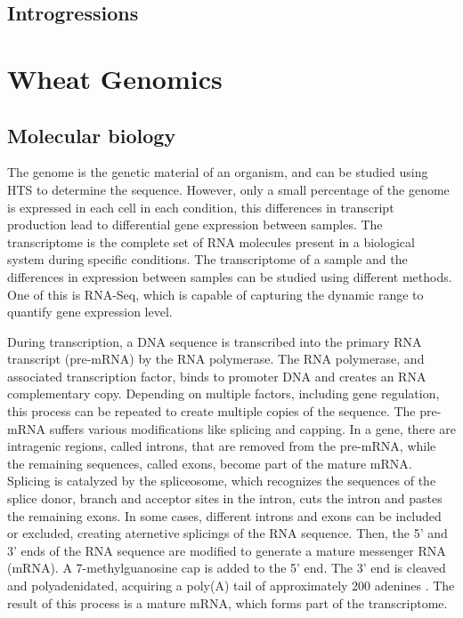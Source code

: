 \subsection{Introgressions}

\section{Wheat Genomics}

\subsection{Molecular biology}
The genome is the genetic material of an organism, and can be studied using HTS to determine the sequence. 
However, only a small percentage of the genome is expressed in each cell in each condition, this differences in transcript production lead to differential gene expression between samples. 
The transcriptome is the complete set of RNA molecules present in a biological system during specific conditions\citep{wang2009rna}.  
The transcriptome of a sample and the differences in expression between samples can be studied using different methods. One of this is RNA-Seq, which is capable of capturing the dynamic range to quantify gene expression level\citep{Mortazavi2008}.

During transcription, a DNA sequence is transcribed into the primary RNA transcript (pre-mRNA) by the RNA polymerase. 
The RNA polymerase, and associated transcription factor, binds to promoter DNA and creates an RNA complementary copy. 
Depending on multiple factors, including gene regulation, this process can be repeated to create multiple copies of the sequence\citep{alberts2014molecular}.
The pre-mRNA suffers various modifications like splicing and capping. 
In a gene, there are  intragenic regions, called introns, that are removed from the pre-mRNA, while the remaining sequences, called exons, become part of the mature mRNA. 
Splicing is catalyzed by the spliceosome, which recognizes the sequences of the splice donor, branch and acceptor sites in the intron, cuts the intron and pastes the remaining exons.
In some cases, different introns and exons can be included or excluded, creating aternetive splicings of the RNA sequence\citep{alberts2014molecular}. 
Then, the 5' and 3' ends of the RNA sequence are modified to generate a mature messenger RNA (mRNA). 
A 7-methylguanosine cap is added to the 5' end. The 3' end is cleaved and polyadenidated, acquiring a poly(A) tail of approximately 200 adenines \citep{alberts2014molecular}. 
The result of this process is a mature mRNA, which forms part of the transcriptome.


